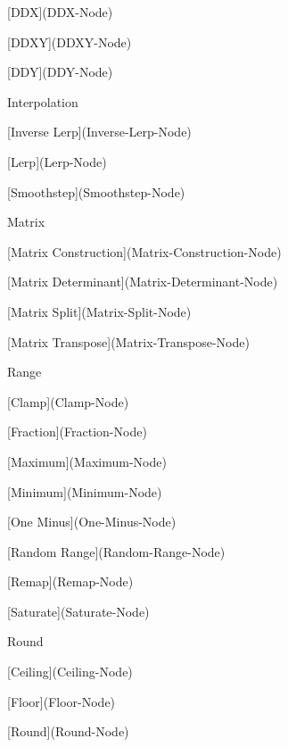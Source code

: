 \begin{DoxyItemize}
\begin{DoxyItemize}
\begin{DoxyItemize}
\begin{DoxyItemize}
\item \mbox{[}DDX\mbox{]}(DDX-\/\+Node)
\item \mbox{[}DDXY\mbox{]}(DDXY-\/\+Node)
\item \mbox{[}DDY\mbox{]}(DDY-\/\+Node)
\end{DoxyItemize}
\item Interpolation
\begin{DoxyItemize}
\item \mbox{[}Inverse Lerp\mbox{]}(Inverse-\/\+Lerp-\/\+Node)
\item \mbox{[}Lerp\mbox{]}(Lerp-\/\+Node)
\item \mbox{[}Smoothstep\mbox{]}(Smoothstep-\/\+Node)
\end{DoxyItemize}
\item Matrix
\begin{DoxyItemize}
\item \mbox{[}Matrix Construction\mbox{]}(Matrix-\/\+Construction-\/\+Node)
\item \mbox{[}Matrix Determinant\mbox{]}(Matrix-\/\+Determinant-\/\+Node)
\item \mbox{[}Matrix Split\mbox{]}(Matrix-\/\+Split-\/\+Node)
\item \mbox{[}Matrix Transpose\mbox{]}(Matrix-\/\+Transpose-\/\+Node)
\end{DoxyItemize}
\item Range
\begin{DoxyItemize}
\item \mbox{[}Clamp\mbox{]}(Clamp-\/\+Node)
\item \mbox{[}Fraction\mbox{]}(Fraction-\/\+Node)
\item \mbox{[}Maximum\mbox{]}(Maximum-\/\+Node)
\item \mbox{[}Minimum\mbox{]}(Minimum-\/\+Node)
\item \mbox{[}One Minus\mbox{]}(One-\/\+Minus-\/\+Node)
\item \mbox{[}Random Range\mbox{]}(Random-\/\+Range-\/\+Node)
\item \mbox{[}Remap\mbox{]}(Remap-\/\+Node)
\item \mbox{[}Saturate\mbox{]}(Saturate-\/\+Node)
\end{DoxyItemize}
\item Round
\begin{DoxyItemize}
\item \mbox{[}Ceiling\mbox{]}(Ceiling-\/\+Node)
\item \mbox{[}Floor\mbox{]}(Floor-\/\+Node)
\item \mbox{[}Round\mbox{]}(Round-\/\+Node)

\end{DoxyItemize}
\end{DoxyItemize}
\end{DoxyItemize}
\end{DoxyItemize}
